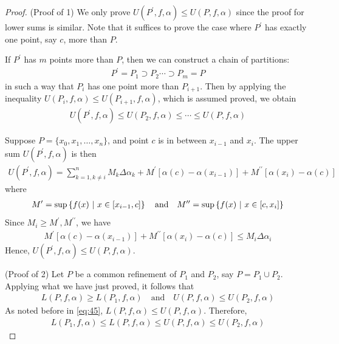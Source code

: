 \documentclass[thmcnt=section, 12pt]{my-elegantbook}
\begin{document}
\begin{proof}
    (Proof of 1) We only prove $U(P^\prime,f,\alpha) \leq U(P,f,\alpha)$ since the proof for lower sums is similar. Note that it suffices to prove the case where $P^\prime$ has exactly one point, say $c$, more than $P$.
    \begin{note}
        If $P^\prime$ has $m$ points more than $P$, then we can construct a chain of partitions:
        \begin{align*}
            P^\prime = P_1 \supset P_2 \cdots \supset P_m = P
        \end{align*}
        in such a way that $P_i$ has one point more than $P_{i+1}$. Then by applying the inequality $U(P_i,f,\alpha) \leq U(P_{i+1},f,\alpha)$, which is assumed proved, we obtain
        \begin{align*}
            U(P^\prime,f,\alpha) \leq U(P_2,f,\alpha) \leq \cdots \leq U(P,f,\alpha)
        \end{align*}
    \end{note}
    Suppose $P=\{x_0,x_1,\ldots,x_n\}$, and point $c$ is in between $x_{i-1}$ and $x_i$. The upper sum $U(P^\prime,f,\alpha)$ is then 
    \begin{align*}
        U(P^\prime,f,\alpha)
        = \sum_{k=1, k \neq i}^n M_k \Delta \alpha_k
            + M^\prime[\alpha(c) - \alpha(x_{i-1})]
            + M^{\prime\prime}[\alpha(x_{i})-\alpha(c)]
    \end{align*}
    where 
    \begin{align*}
        M^\prime = \sup\left\{ f(x) \ \middle| \ x \in [x_{i-1}, c] \right\}
        \quad\text{and}\quad
        M^{\prime\prime} = \sup\left\{ f(x) \ \middle| \ x \in [c, x_i] \right\}
    \end{align*}
    Since $M_i \geq M^\prime, M^{\prime\prime}$, we have 
    \begin{align*}
        M^\prime[\alpha(c) - \alpha(x_{i-1})]
        + M^{\prime\prime}[\alpha(x_{i})-\alpha(c)]
        \leq M_i \Delta \alpha_i
    \end{align*}
    Hence, $U(P^\prime,f,\alpha) \leq U(P,f,\alpha)$.

    (Proof of 2) Let $P$ be a common refinement of $P_1$ and $P_2$, say $P = P_1 \cup P_2$. Applying what we have just proved, it follows that 
    \begin{align*}
        L(P,f,\alpha) \geq L(P_1,f,\alpha)
        \quad \text{and} \quad
        U(P,f,\alpha) \leq U(P_2,f,\alpha)
    \end{align*}
    As noted before in \eqref{eq:45}, $L(P,f,\alpha) \leq U(P,f,\alpha)$. Therefore, 
    \begin{align*}
        L(P_1,f,\alpha) \leq L(P,f,\alpha)
        \leq U(P,f,\alpha) \leq U(P_2,f,\alpha)
    \end{align*}
\end{proof}
\end{document}
